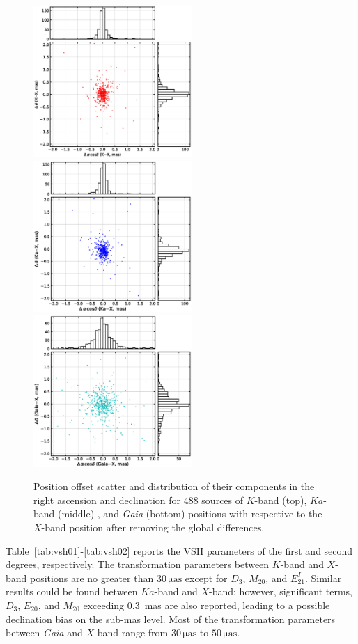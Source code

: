 \documentclass{aa}
\begin{document}
    \begin{figure}[hbtp]
        \centering
        \includegraphics[width=60mm]{figs/k-sx-scatter}
        \includegraphics[width=60mm]{figs/xka-sx-scatter}
        \includegraphics[width=60mm]{figs/gaia-sx-scatter}
        \caption[]{\label{fig:pos-offset-scatter}
            Position offset scatter and distribution of their components in the right ascension and declination for 488 sources of  $K$-band (top), $Ka$-band (middle) , and \textit{Gaia} (bottom) positions with respective to the $X$-band position after removing the global differences.
        }
    \end{figure}

   Table~\ref{tab:vsh01}-\ref{tab:vsh02} reports the VSH parameters of the first and second degrees, respectively.
   The transformation parameters between $K$-band and $X$-band positions are no greater than $30\,\mathrm{\mu as}$ except for $D_3$, $M_{20}$, and $E_{21}^I$.
   Similar results could be found between $Ka$-band and $X$-band; however, significant terms, $D_3$, $E_{20}$, and $M_{20}$ exceeding 0.3~mas are also reported, leading to a possible declination bias on the sub-mas level.
   Most of the transformation parameters between \textit{Gaia} and $X$-band range from $30\,\mathrm{\mu as}$ to $50\,\mathrm{\mu as}$.
\end{document}
